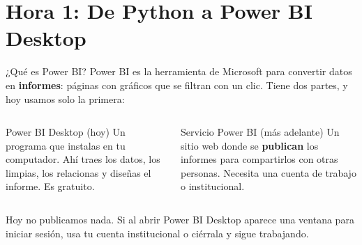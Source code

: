\documentclass[aspectratio=169,11pt]{beamer}
\begin{document}
\section{Hora 1: De Python a Power BI Desktop}
\begin{frame}[t]{¿Qué es Power BI?}
  \small
  Power BI es la herramienta de Microsoft para convertir datos en
  \textbf{informes}: páginas con gráficos que se filtran con un clic.
  Tiene dos partes, y hoy usamos solo la primera:
  \vspace{0.15cm}
  \begin{columns}[T,onlytextwidth]
    \begin{block}{Power BI Desktop (hoy)}
      \small Un programa que instalas en tu computador. Ahí traes los
      datos, los limpias, los relacionas y diseñas el informe. Es
      gratuito.
    \end{block}
    \begin{exampleblock}{Servicio Power BI (más adelante)}
      \small Un sitio web donde se \textbf{publican} los informes para
      compartirlos con otras personas. Necesita una cuenta de trabajo o
      institucional.
    \end{exampleblock}
  \end{columns}
  \vspace{0.15cm}
  \small Hoy no publicamos nada. Si al abrir Power BI Desktop aparece una
  ventana para iniciar sesión, usa tu cuenta institucional o ciérrala y
  sigue trabajando.
\end{frame}
\end{document}
